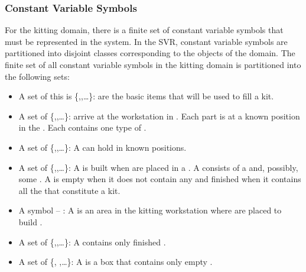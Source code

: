 \subsubsection{Constant Variable Symbols}
For the kitting domain, there is a finite set of constant variable symbols that must be represented in the system. In the SVR, constant variable symbols are partitioned into disjoint classes corresponding to the objects of the domain. The finite set of all constant variable symbols in the kitting domain is partitioned into the following sets:
\begin{itemize}
\item A set of  this is \{,,\ldots\}:  are the basic items that will be used to fill a kit.

\item A set of  \{,,\ldots\}:  arrive at the workstation in . Each part is at a known position in the . Each  contains one type of .

\item A set of  \{,,\ldots\}:  A  can hold  in known positions.

\item A set of  \{,,\ldots\}: A  is built when  are placed in a . A  consists of a  and, possibly, some . A  is empty when it does not contain any  and finished when it contains all the  that constitute a kit.

\item A symbol  -- : A  is an area in the kitting workstation where  are placed to build .

\item A set of  \{,,\ldots\}: A  contains only finished .

\item A set of  \{, ,\ldots\}: A  is a box that contains only empty .


\end{itemize}

